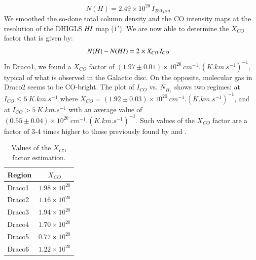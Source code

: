 \documentclass[traditabstract]{aa}
\begin{document}
\begin{equation}
  N(H)=2.49\times 10^{20}\, I_{250\: \mu m}
\end{equation}
We smoothed the so-done total column density and the CO intensity maps at the resolution of the DHIGLS $H\rmnum{1}$ map ($1'$). We are now able to determine the $X_{CO}$ factor that is given by:
\begin{equation}
  N(H)-N(H\rmnum{1})=2\times X_{CO}\, I_{CO}
\end{equation}
In Draco1, we found a $X_{CO}$ factor of $(1.97\pm 0.01)\times 10^{20}\: cm^{-1}.(K.km.s^{-1})^{-1}$, typical of what is observed in the Galactic disc\citep{Bolatto_2013}. On the opposite, molecular gas in Draco2 seems to be CO-bright. The plot of $I_{CO}$ vs. $N_{H_2}$ shows two regimes: at $I_{CO}\leq 5\: K.km.s^{-1}$ where $X_{CO}=(1.92\pm 0.03)\times 10^{20}\: cm^{-1}.(K.km.s^{-1})^{-1}$, and at $I_{CO}>5\: K.km.s^{-1}$ with an average value of $(0.55\pm 0.04)\times 10^{20}\: cm^{-1}.(K.km.s^{-1})^{-1}$.
Such values of the $X_{CO}$ factor are a factor of 3-4 times higher to those previously found by \cite{Herbstmeier_1993} and \cite{Moritz_1998}.

\begin{table}[h]
  \centering
  \footnotesize
  \caption{\label{table:Xco} Values of the $X_{CO}$ factor estimation.}
  \begin{tabular}{lc}
    \hline \hline
    Region &       $X_{CO}$       \\ \hline 
    Draco1 & $1.98\times 10^{20}$ \\
    Draco2 & $1.16\times 10^{20}$ \\
    Draco3 & $1.94\times 10^{20}$ \\
    Draco4 & $1.70\times 10^{20}$ \\
    Draco5 & $0.77\times 10^{20}$ \\
    Draco6 & $1.22\times 10^{20}$ \\ \hline
  \end{tabular}
\end{table}
\end{document}
